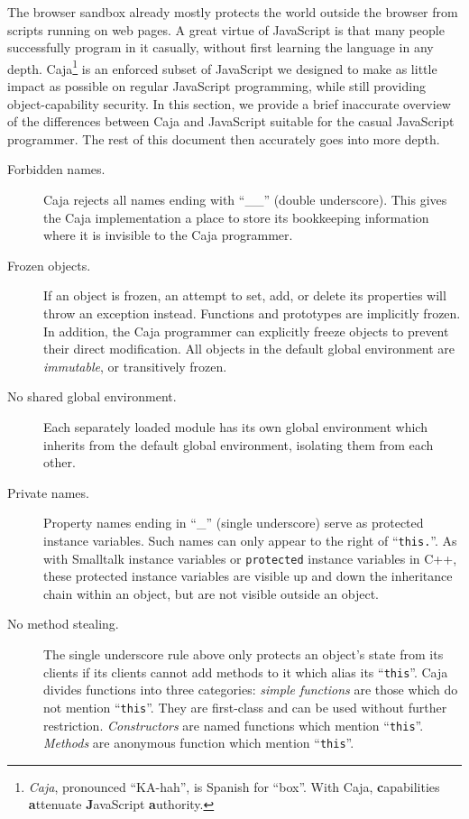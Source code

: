 \documentclass[letterpaper,twocolumn,10pt]{article}
\newcommand{\code}[1]{{\tt {#1}}}              %
\begin{document}
The browser sandbox already mostly protects the world outside the browser 
from scripts running on web pages. A great virtue of JavaScript is that many 
people successfully program in it casually, without first learning the 
language in any depth. Caja\footnote{
%
\emph{Caja}, pronounced ``KA-hah'', is Spanish for ``box''. With Caja, 
\textbf{c}apabilities \textbf{a}ttenuate \textbf{J}avaScript 
\textbf{a}uthority.
%
} is an enforced subset of JavaScript we designed to make as little impact as 
possible on regular JavaScript programming, while still providing 
object-capability security. In this section, we provide a brief inaccurate 
overview of the differences between Caja and JavaScript suitable for the 
casual JavaScript programmer. The rest of this document then accurately goes 
into more depth.

\begin{description}

  \item[Forbidden names.] Caja rejects all names ending with ``\_\_'' (double 
  underscore). This gives the Caja implementation a place to store its 
  bookkeeping information where it is invisible to the Caja programmer.
 
  \item[Frozen objects.] If an object is frozen, an attempt to set, add, or 
  delete its properties will throw an exception instead. Functions and 
  prototypes are implicitly frozen. In addition, the Caja programmer can 
  explicitly freeze objects to prevent their direct modification. All objects 
  in the default global environment are \emph{immutable}, or transitively 
  frozen.
 
  \item[No shared global environment.] Each separately loaded module has its 
  own global environment which inherits from the default global environment, 
  isolating them from each other.

  \item[Private names.] Property names ending in ``\_'' (single underscore) 
  serve as protected instance variables. Such names can only appear to the 
  right of ``\code{this.}''. As with Smalltalk instance variables or 
  \code{protected} instance variables in C++, these protected instance 
  variables are visible up and down the inheritance chain within an object, 
  but are not visible outside an object.
 
  \item[No method stealing.] The single underscore rule above only protects 
  an object's state from its clients if its clients cannot add methods to it 
  which alias its ``\code{this}''. Caja divides functions into three 
  categories: \emph{simple functions} are those which do not mention 
  ``\code{this}''. They are first-class and can be used without further 
  restriction. \emph{Constructors} are named functions which mention 
  ``\code{this}''. \emph{Methods} are anonymous function which mention 
  ``\code{this}''.


\end{description}
\end{document}
